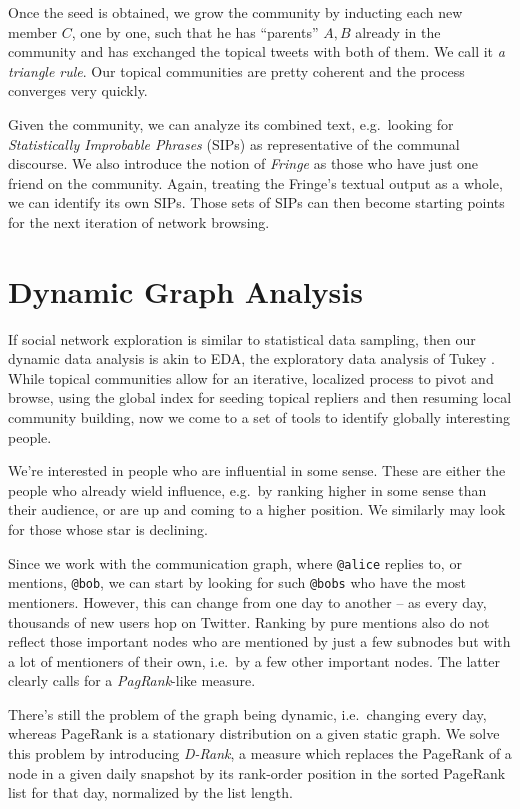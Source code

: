\documentclass[10pt,oneside]{memoir}
\begin{document}
Once the seed is obtained, we grow the community by inducting each new member $C$, one by one, such that he has ``parents'' ${A,B}$ already in the community and has exchanged the topical tweets with both of them.  We call it {\itshape a triangle rule}.  Our topical communities are pretty coherent and the process converges very quickly.


Given the community, we can analyze its combined text, e.g.\ looking for {\itshape Statistically Improbable Phrases} (SIPs) as representative of the communal discourse.  We also introduce the notion of {\itshape Fringe} as those who have just one friend on the community.  Again, treating the Fringe's textual output as a whole, we can identify its own SIPs.  Those sets of SIPs can then become starting points for the next iteration of network browsing.


\pagebreak \section{Dynamic Graph Analysis}
\label{dynamicgraphanalysis}

If social network exploration is similar to statistical data sampling, then our dynamic data analysis is akin to   EDA, the exploratory data analysis of Tukey \cite{Tukey:1977:EDA}.  While topical communities allow for an iterative, localized process to pivot and browse, using the global index for seeding topical repliers and then resuming local community building, now we come to a set of tools to identify globally interesting people.


We're interested in people who are influential in some sense.  These are either the people who already wield influence, e.g.\ by ranking higher in some sense than their audience, or are up and coming to a higher position.  We similarly may look for those whose star is declining.


Since we work with the communication graph, where \texttt{@alice} replies to, or mentions, \texttt{@bob}, we can start by looking for such \texttt{@bobs} who have the most mentioners.  However, this can change from one day to another -- as every day, thousands of new users hop on Twitter.  Ranking by pure mentions also do not reflect those important nodes who are mentioned by just a few subnodes but with a lot of mentioners of their own, i.e.\ by a few other important nodes.  The latter clearly calls for a {\itshape PagRank}-like measure.  


There's still the problem of the graph being dynamic, i.e.\ changing every day, whereas PageRank is a stationary distribution on a given static graph.  We solve this problem by introducing {\itshape D-Rank}, a measure which replaces the PageRank of a node in a given daily snapshot by its rank-order position in the sorted PageRank list for that day, normalized by the list length.
\end{document}

